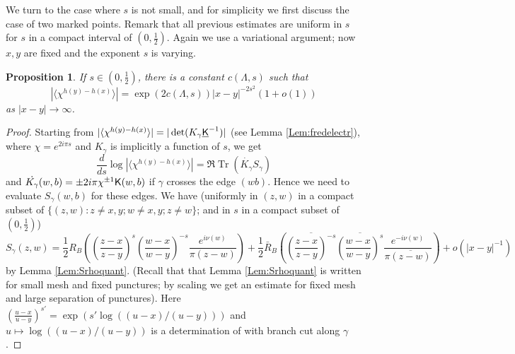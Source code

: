 \documentclass[10pt]{article}
\newcommand{\rK}{{\sf K}}
\newcommand{\uK}{{\underline {\sf K}}}
\DeclareMathOperator{\Tr}{Tr}
\newtheorem{Prop}[thm]{Proposition}
\begin{document}
We turn to the case where $s$ is not small, and for simplicity we first discuss the case of two marked points. Remark that all previous estimates are uniform in $s$ for $s$ in a compact interval of $(0,\frac 12)$. Again we use a variational argument; now $x,y$ are fixed and the exponent $s$ is varying.
%
%
%
%
%
\begin{Prop}\label{Prop:electrpairs}
If $s\in(0,\frac 12)$, there is a constant $c(\Lambda,s)$ such that 
$$|\langle\chi^{h(y)-h(x)}\rangle|=\exp(2c(\Lambda,s))|x-y|^{-2s^2}(1+o(1))$$
as $|x-y|\rightarrow\infty$.
\end{Prop}
\begin{proof}
Starting from $|\langle \chi^{h(y)-h(x)}\rangle|=|\det(K_\gamma\uK^{-1})|$ (see Lemma \ref{Lem:fredelectr}), where $\chi=e^{2i\pi s}$ and $K_\gamma$ is implicitly a function of $s$, we get
$$\frac{d}{ds}\log|\langle \chi^{h(y)-h(x)}\rangle|=\Re\Tr(\dot{K_\gamma}S_{\gamma})$$
and $\dot{K_\gamma}(w,b)=\pm 2i\pi\chi^{\pm 1}\rK(w,b)$ if $\gamma$ crosses the edge $(wb)$. Hence we need to evaluate $S_\gamma(w,b)$ for these edges. We have (uniformly in $(z,w)$ in a compact subset of $\{(z,w):z\neq x,y;w\neq x,y;z\neq w\}$; and in $s$ in a compact subset of $(0,\frac 12)$)
$$S_\gamma(z,w)=\frac 12R_B\left(\left(\frac{z-x}{z-y}\right)^s\left(\frac{w-x}{w-y}\right)^{-s}\frac{e^{i\nu(w)}}{\pi(z-w)}\right)
+\frac 12\bar R_B\left(\overline{\left(\frac{z-x}{z-y}\right)^{-s}}\overline{\left(\frac{w-x}{w-y}\right)^{s}}\frac{e^{-i\nu(w)}}{\pi\overline{(z-w)}}\right)+o(|x-y|^{-1})$$
by Lemma \ref{Lem:Srhoquant}. (Recall that that Lemma \ref{Lem:Srhoquant} is written for small mesh and fixed punctures; by scaling we get an estimate for fixed mesh and large separation of punctures). Here $\left(\frac{u-x}{u-y}\right)^{s'}=\exp(s'\log((u-x)/(u-y)))$ and $u\mapsto\log((u-x)/(u-y))$ is a determination of with branch cut along $\gamma$. 


\end{proof}
\end{document}
